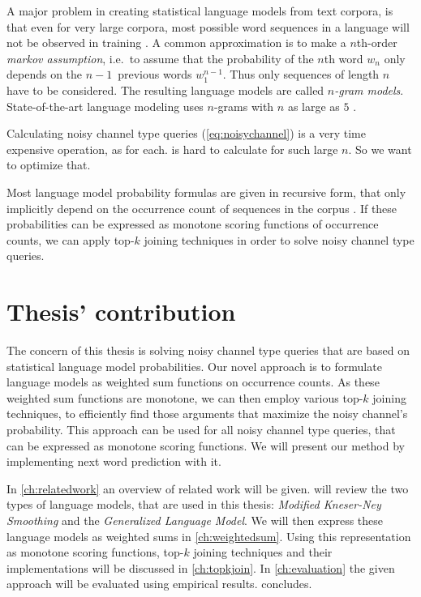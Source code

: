 A major problem in creating statistical language models from text corpora, is
that even for very large corpora, most possible word sequences in a language
will not be observed in training \noref.
A common approximation is to make a $n$th-order \emph{markov assumption},
i.e.\ to assume that the probability of the $n$th word $w_n$ only depends on
the $n\!-\!1$~previous words $w_1^{n-1}$.
Thus only sequences of length $n$ have to be considered.
The resulting language models are called \emph{$n$-gram models}.
State-of-the-art language modeling uses $n$-grams with $n$ as large as $5$
\parencite{JurafskyMartin2009,Goodman2001,Stolcke2000}.

\begin{draft}
Calculating noisy channel type queries (\cref{eq:noisychannel}) is a very time
expensive operation, as for each.
 is hard to calculate for such large $n$.
So we want to optimize that.
\end{draft}

Most language model probability formulas are given in recursive form, that only
implicitly depend on the occurrence count of sequences in the corpus \noref.
If these probabilities can be expressed as monotone scoring functions of
occurrence counts, we can apply top-$k$ joining techniques in order to solve
noisy channel type queries.

\section{Thesis' contribution}

The concern of this thesis is solving noisy channel type queries that are based
on statistical language model probabilities.
Our novel approach is to formulate language models as weighted sum functions on
occurrence counts.
As these weighted sum functions are monotone, we can then employ various
top-$k$ joining techniques, to efficiently find those arguments that maximize
the noisy channel's probability.
This approach can be used for all noisy channel type queries, that can be
expressed as monotone scoring functions.
We will present our method by implementing next word prediction with it.

In \cref{ch:relatedwork} an overview of related work will be given.
 will review the two types of language models, that are used in
this thesis: \emph{Modified Kneser-Ney Smoothing} and the \emph{Generalized
Language Model}.
We will then express these language models as weighted sums in
\cref{ch:weightedsum}.
Using this representation as monotone scoring functions, top-$k$ joining
techniques and their implementations will be discussed in \cref{ch:topkjoin}.
In \cref{ch:evaluation} the given approach will be evaluated using empirical
results.
 concludes.

